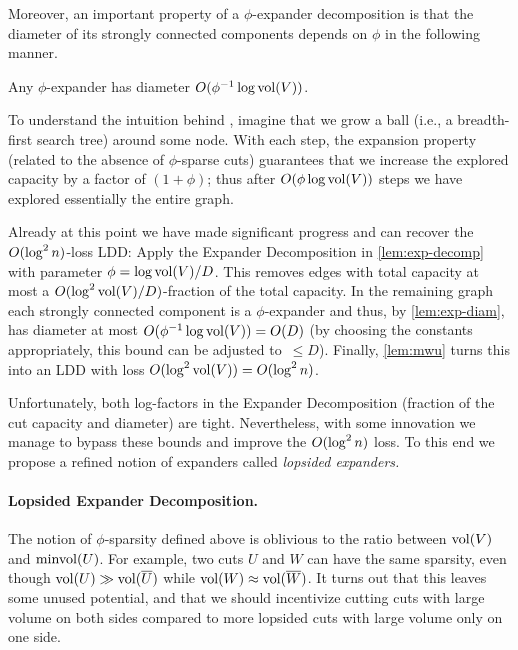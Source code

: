 \documentclass[letterpaper,11pt]{article}
\begin{document}
Moreover, an important property of a $\phi$-expander decomposition is that the diameter of its strongly connected components depends on $\phi$ in the following manner. 

\begin{lemma} \label{lem:exp-diam}
Any $\phi$-expander has diameter $O(\phi^{-1} \log \operatorname{vol}(V))$.
\end{lemma}

To understand the intuition behind , imagine that we grow a ball (i.e., a breadth-first search tree) around some node. With each step, the expansion property (related to the absence of $\phi$-sparse cuts) guarantees that we increase the explored capacity by a factor of $(1 + \phi)$; thus after $O(\phi \log \operatorname{vol}(V))$ steps we have explored essentially the entire graph.

Already at this point we have made significant progress and can recover the $O(\log^2 n)$-loss LDD: Apply the Expander Decomposition in \cref{lem:exp-decomp} with parameter $\phi = \log \operatorname{vol}(V) / D$. This removes edges with total capacity at most a $O(\log^2 \operatorname{vol}(V) / D)$-fraction of the total capacity. In the remaining graph each strongly connected component is a $\phi$-expander and thus, by \cref{lem:exp-diam}, has diameter at most $O(\phi^{-1} \log\operatorname{vol}(V)) = O(D)$ (by choosing the constants appropriately, this bound can be adjusted to~$\leq D$). Finally, \cref{lem:mwu} turns this into an LDD with loss $O(\log^2 \operatorname{vol}(V)) = O(\log^2 n)$.

Unfortunately, both log-factors in the Expander Decomposition (fraction of the cut capacity and diameter) are tight. Nevertheless, with some innovation we manage to bypass these bounds and improve the $O(\log^2 n)$ loss. To this end we propose a refined notion of expanders called \emph{lopsided expanders.}

\paragraph{Lopsided Expander Decomposition.}

The notion of $\phi$-sparsity defined above is oblivious to the ratio between $\operatorname{vol}(V)$ and $\operatorname{minvol}(U)$. For example, two cuts $U$ and $W$ can have the same sparsity, even though $\operatorname{vol}(U) \gg \operatorname{vol}(\overline U)$ while $\operatorname{vol}(W) \approx \operatorname{vol}(\overline W)$. It turns out that this leaves some unused potential, and that we should incentivize cutting cuts with large volume on both sides compared to more lopsided cuts with large volume only on one side.
\end{document}
